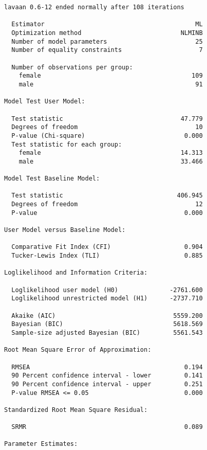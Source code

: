 \documentclass[
  letterpaper,
  DIV=11,
  numbers=noendperiod]{scrreprt}
\begin{document}
\begin{verbatim}
lavaan 0.6-12 ended normally after 108 iterations

  Estimator                                         ML
  Optimization method                           NLMINB
  Number of model parameters                        25
  Number of equality constraints                     7

  Number of observations per group:                   
    female                                         109
    male                                            91

Model Test User Model:
                                                      
  Test statistic                                47.779
  Degrees of freedom                                10
  P-value (Chi-square)                           0.000
  Test statistic for each group:
    female                                      14.313
    male                                        33.466

Model Test Baseline Model:

  Test statistic                               406.945
  Degrees of freedom                                12
  P-value                                        0.000

User Model versus Baseline Model:

  Comparative Fit Index (CFI)                    0.904
  Tucker-Lewis Index (TLI)                       0.885

Loglikelihood and Information Criteria:

  Loglikelihood user model (H0)              -2761.600
  Loglikelihood unrestricted model (H1)      -2737.710
                                                      
  Akaike (AIC)                                5559.200
  Bayesian (BIC)                              5618.569
  Sample-size adjusted Bayesian (BIC)         5561.543

Root Mean Square Error of Approximation:

  RMSEA                                          0.194
  90 Percent confidence interval - lower         0.141
  90 Percent confidence interval - upper         0.251
  P-value RMSEA <= 0.05                          0.000

Standardized Root Mean Square Residual:

  SRMR                                           0.089

Parameter Estimates:


\end{verbatim}
\end{document}
